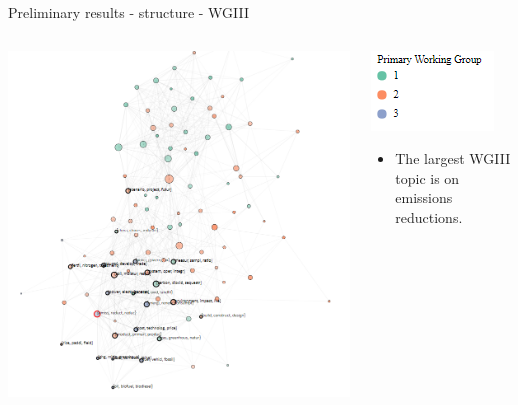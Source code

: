 \documentclass[9pt]{beamer}
\begin{document}
\begin{frame}{Preliminary results - structure - WGIII}

\begin{columns}
	\begin{column}{0.65\linewidth}
		\begin{center}
			\vspace*{-0.1\linewidth}
			\includegraphics[width=1.1\linewidth]{../plots/network_wg_372_3.PNG}
		\end{center}
	\end{column}
	\begin{column}{0.35\linewidth}
		\includegraphics[width=0.4\linewidth]{../plots/network_wg_key.PNG}
		\begin{center}
			\begin{itemize}
				\item The largest WGIII topic is on emissions reductions.
			\end{itemize}
		\end{center}
	\end{column}
\end{columns}

\end{frame}
\end{document}
